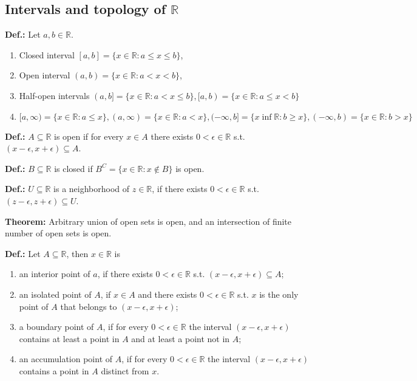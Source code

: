 \documentclass{article}
\begin{document}
\subsection{\texorpdfstring{Intervals and topology of $\mathbb{R}$}{Intervals and topology of R}}

\textbf{Def.:} Let $a, b \in \mathbb{R}$.
\begin{enumerate}
    \item Closed interval $[a, b]=\{x\in \mathbb{R}:a\leq x\leq b\}$,
    \item Open interval $(a, b)=\{x\in \mathbb{R}:a<x<b\}$,
    \item Half-open intervals $(a, b\text{]}=\{x\in \mathbb{R}:a<x\leq b\}, \text{[}a, b)=\{x\in \mathbb{R}:a\leq x < b\}$
    \item $\text{[}a, \infty)=\{x\in \mathbb{R}:a\leq x\}, (a, \infty)=\{x\in \mathbb{R}:a<x\}, (-\infty, b\text{]}=\{x\inf \mathbb{R}:b\geq x\}, (-\infty, b)=\{x\in \mathbb{R}:b>x\}$
\end{enumerate}

\textbf{Def.:} $A\subseteq \mathbb{R}$ is open if for every $x\in A$ there exists $0<\epsilon \in \mathbb{R}$ s.t. $(x-\epsilon, x+\epsilon)\subseteq A$.

\textbf{Def.:} $B\subseteq \mathbb{R}$ is closed if $B^C=\{x\in \mathbb{R}:x\notin B\}$ is open.

\textbf{Def.:} $U\subseteq \mathbb{R}$ is a neighborhood of $z\in \mathbb{R}$, if there exists $0<\epsilon \in \mathbb{R}$ s.t. $(z-\epsilon, z+\epsilon)\subseteq U$.

\textbf{Theorem:} Arbitrary union of open sets is open, and an intersection of finite number of open sets is open.

\textbf{Def.:} Let $A\subseteq \mathbb{R}$, then $x\in \mathbb{R}$ is
\begin{enumerate}
    \item an interior point of $a$, if there exists $0<\epsilon \in \mathbb{R}$ s.t. $(x-\epsilon, x+\epsilon)\subseteq A$;
    \item an isolated point of $A$, if $x\in A$ and there exists $0<\epsilon \in \mathbb{R}$ s.t. $x$ is the only point of $A$ that belongs to $(x-\epsilon, x+\epsilon)$; 
    \item a boundary point of $A$, if for every $0<\epsilon \in \mathbb{R}$ the interval $(x-\epsilon, x+\epsilon)$ contains at least a point in $A$ and at least a point not in $A$;
    \item an accumulation point of $A$, if for every $0<\epsilon \in \mathbb{R}$ the interval $(x-\epsilon, x+\epsilon)$ contains a point in $A$ distinct from $x$. 
\end{enumerate}
\end{document}
